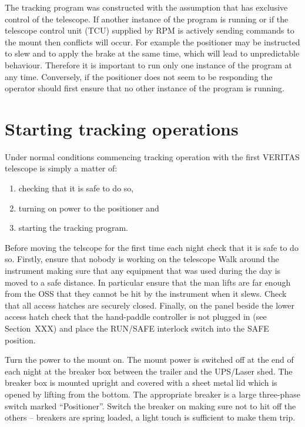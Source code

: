 \documentclass[letterpaper,12pt]{report}
\begin{document}
The tracking program was constructed with the assumption that has
exclusive control of the telescope. If another instance of the program
is running or if the telescope control unit (TCU) supplied by RPM is
actively sending commands to the mount then conflicts will occur. For
example the positioner may be instructed to slew and to apply the
brake at the same time, which will lead to unpredictable behaviour. 
Therefore it is important to run only one instance of the program at
any time.  Conversely, if the positioner does not seem to be
responding the operator should first ensure that no other instance of
the program is running.

\section{Starting tracking operations}

Under normal conditions commencing tracking operation with the first
VERITAS telescope is simply a matter of:
\begin{enumerate}
\item checking that it is safe to do so,
\item turning on power to the positioner and
\item starting the tracking program.
\end{enumerate}

Before moving the telscope for the first time each night check that it
is safe to do so. Firstly, ensure that nobody is working on the
telescope Walk around the instrument making sure that any equipment
that was used during the day is moved to a safe distance. In
particular ensure that the man lifts are far enough from the OSS that
they cannot be hit by the instrument when it slews. Check that all
access hatches are securely closed. Finally, on the panel beside the
lower access hatch check that the hand-paddle controller is not
plugged in (see Section~XXX) and place the RUN/SAFE interlock switch
into the SAFE position.

Turn the power to the mount on. The mount power is switched off at the
end of each night at the breaker box between the trailer and the
UPS/Laser shed. The breaker box is mounted upright and covered with a
sheet metal lid which is opened by lifting from the bottom. The
appropriate breaker is a large three-phase switch marked
``Positioner''. Switch the breaker on making sure not to hit off the
others -- breakers are spring loaded, a light touch is sufficient to
make them trip.
\end{document}
